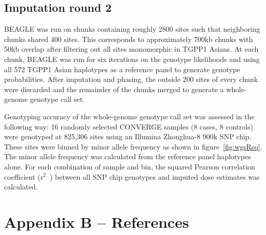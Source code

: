 \documentclass[a4paper]{article}
\newcommand{\rsq}{$\mbox{r}^2$~}
\begin{document}
\subsection*{Imputation round 2}

BEAGLE was run on chunks containing roughly 2800 sites such
that neighboring chunks shared 400 sites. This corresponds to
approximately 700kb chunks with 50kb overlap after filtering out all
sites monomorphic in TGPP1 Asians. At each
chunk, BEAGLE was run for six iterations on the genotype likelihoods
and using all 572 TGPP1
Asian haplotypes as a reference panel to generate genotype
probabilities.  After imputation and phasing, the outside 200 sites of
every chunk were discarded and the remainder of the chunks merged to
generate a whole-genome genotype call set.

Genotyping accuracy of the whole-genome genotype call set was assessed
in the following way: 16 randomly selected CONVERGE samples (8 cases,
8 controls) were genotyped at 825,306 sites using an Illumina
Zhonghua-8 900k SNP chip.  These sites were binned by minor allele
frequency as shown in figure~\ref{fig:wgsRsq}.  The minor allele frequency was
calculated from the reference panel haplotypes alone. For each
combination of sample and bin, the squared Pearson correlation
coefficient (\rsq) between all SNP chip genotypes and imputed dose
estimates was calculated.

\newpage

\section*{Appendix B -- References}


\printbibliography
\end{document}
